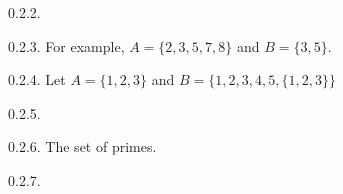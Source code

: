\begin {itemize}
\begin{ans}{0.2.2.}
  
\end{ans}
\begin{ans}{0.2.3.}
    For example, $A = \{2,3,5,7,8\}$ and $B = \{3,5\}$.
  
\end{ans}
\begin{ans}{0.2.4.}
    Let $A = \{1,2,3\}$ and $B = \{1,2,3,4,5,\{1,2,3\}\}$
  
\end{ans}
\begin{ans}{0.2.5.}
  
\end{ans}
\begin{ans}{0.2.6.}
    The set of primes.
  
\end{ans}
\begin{ans}{0.2.7.}
      \begin{parts}
	  \def\circleA{(-.5,0) circle (1)}
	  \def\circleAlabel{(-1.5,.6) node[above]{$A$}}
	  \def\circleB{(.5,0) circle (1)}
	  \def\circleBlabel{(1.5,.6) node[above]{$B$}}
	  \def\circleC{(0,-1) circle (1)}
	  \def\circleClabel{(.5,-2) node[right]{$C$}}
	  \def\twosetbox{(-2,-1.5) rectangle (2,1.5)}
	  \def\threesetbox{(-2,-2.5) rectangle (2,1.5)}




\end{parts}
\end{ans}
\end{itemize}
